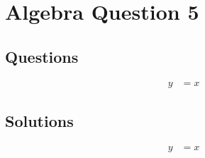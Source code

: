 \chapter{Algebra Question 5}
\label{chap:aq5}

\section{Questions}
\label{sec:aq5q}
\begin{align}
  y &= x
\end{align}

\section{Solutions}
\label{sec:aq5s}
\begin{align}
  y &= x
\end{align}